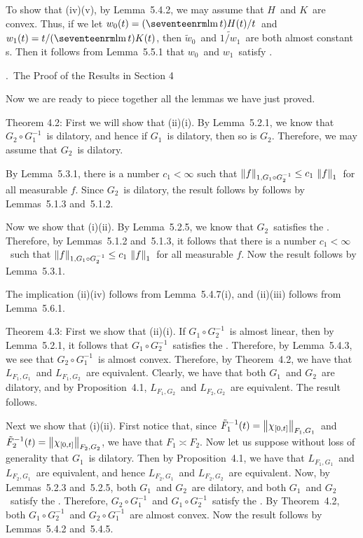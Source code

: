 To show that (iv)\implies(v), by Lemma~5.4.2, we may assume that
$H$\ and $K$\ are convex. Thus, if we let
$w_0(t) = (\lm t) H(t)/t$\ and $w_1(t) = t/(\lm t )K(t)$, then $\tilde w_0$\ and
$\widetilde{1/w_1}$\ are both almost constant \phifunction s. Then it follows
from Lemma~5.5.1 that $w_0$\ and $w_1$\ satisfy \conditionL.
\endproof

.\ The Proof of the Results in Section 4

Now we are ready to piece together all the lemmas we have just proved.

\Proofof Theorem 4.2:  First we will show that (ii)\implies(i). By Lemma~5.2.1,
we know that $G_2\circ G_1^{-1}$\ is dilatory, and hence if $G_1$\ is dilatory,
then so is $G_2$. Therefore, we may assume that $G_2$\ is dilatory. 

By Lemma~5.3.1, there is a number $c_1<\infty$ such that $\left\| f \right\|_{1,G_1\circ G_2^{-1}} \le c_1\, \left\| f \right\|_1$\ for all measurable $f$. Since
$G_2$\ is dilatory, the result follows by follows by Lemmas~5.1.3 and~5.1.2.

Now we show that (i)\implies(ii). By Lemma~5.2.5, we know that
$G_2$\ satisfies the \Deltacond. Therefore, by Lemmas~5.1.2 and~5.1.3, 
it follows that there is a number $c_1<\infty$\ such
that $\left\| f \right\|_{1,G_1\circ G_2^{-1}} \le c_1\, \left\| f \right\|_1$\ for all measurable
$f$. Now the result follows by Lemma~5.3.1.

The implication (ii)\iff(iv) follows from Lemma~5.4.7(i), and (ii)\iff(iii)
follows from Lemma~5.6.1.
\endproof

\Proofof Theorem 4.3:  First we show that (ii)\implies(i). If $G_1\circ
G_2^{-1}$\ is almost linear, then by Lemma~5.2.1, it follows that $G_1\circ
G_2^{-1}$\ satisfies the \Deltacond. Therefore, by Lemma~5.4.3, we see
that $G_2\circ G_1^{-1}$\ is almost convex. Therefore, by Theorem~4.2, we have
that $L_{F_1,G_1}$\ and $L_{F_1,G_2}$\ are equivalent. Clearly, we have
that both $G_1$\ and $G_2$\ are dilatory, and by
Proposition~4.1, $L_{F_1,G_2}$\ and $L_{F_2,G_2}$\ are equivalent. The result
follows.

Next we show that (i)\implies(ii). First notice that, since $\tilde
F_1^{-1}(t) = \left\| \chi_{[0,t]} \right\|_{F_1,G_1}$\ and  $\tilde
F_2^{-1}(t) = \left\| \chi_{[0,t]} \right\|_{F_2,G_2}$, we have that $F_1 \asymp F_2$.
Now let us suppose without loss of generality that $G_1$\ is dilatory. Then by
Proposition~4.1, we have that $L_{F_1,G_1}$\ and $L_{F_2,G_1}$\ are equivalent,
and hence $L_{F_2,G_1}$\ and $L_{F_2,G_2}$\ are equivalent. Now, by
Lemmas~5.2.3 and~5.2.5, both $G_1$\ and $G_2$\ are dilatory, and both $G_1$\ and
$G_2$\ satisfy the \Deltacond. Therefore, $G_2\circ G_1^{-1}$\ and
$G_1\circ G_2^{-1}$\ satisfy the
\Deltacond. By Theorem~4.2, both $G_1\circ G_2^{-1}$\ and $G_2\circ
G_1^{-1}$\ are almost convex. Now the result follows by Lemmas~5.4.2 and~5.4.5.

